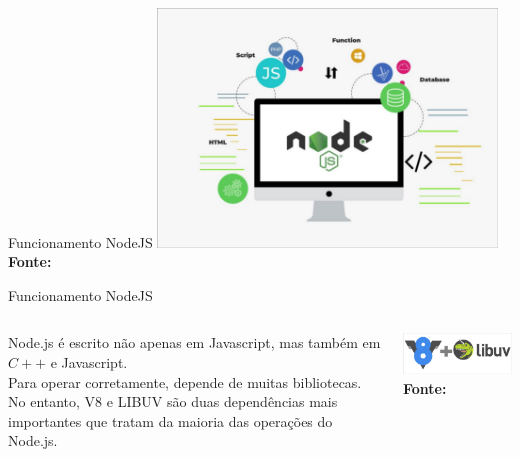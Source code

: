 \documentclass{beamer}
\begin{document}
    \begin{frame}[label=lists]{Funcionamento NodeJS}
            \includegraphics[width=90mm]{resources/aula1_5.png}\\
            \tiny{\textbf{Fonte:} \cite{ich2021}}
    \end{frame}
    \begin{frame}[label=lists]{Funcionamento NodeJS}
      \begin{columns}[onlytextwidth]
          \alert{Node.js} é escrito não apenas em Javascript, mas também em $C++$ e Javascript. \\
          Para operar corretamente, depende de muitas bibliotecas. \\
          No entanto, V8 e LIBUV são duas dependências mais importantes que tratam da maioria das operações do Node.js.

            \includegraphics[width=55mm]{resources/aula1_6.png}\\
            \tiny{\textbf{Fonte:} \cite{ich2021}}

      \end{columns}
    \end{frame}
    
\end{document}
